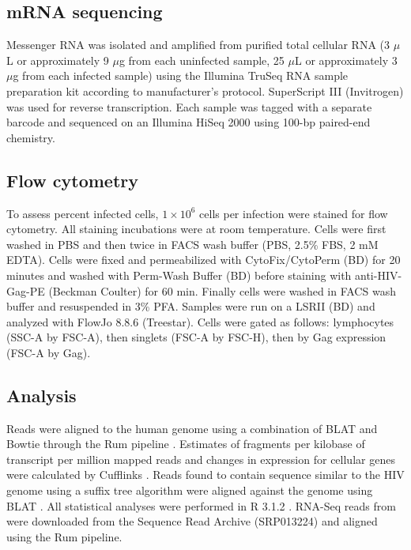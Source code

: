 \documentclass[../sherrill-Mix_thesis.tex]{subfiles}
\begin{document}
	\subsection{mRNA sequencing}
		Messenger RNA was isolated and amplified from purified total cellular RNA (3 $\mu$L or approximately 9 $\mu$g from each uninfected sample, 25 $\mu$L or approximately 3 $\mu$g from each infected sample) using the Illumina TruSeq RNA sample preparation kit according to manufacturer's protocol.  SuperScript III (Invitrogen) was used for reverse transcription. Each sample was tagged with a separate barcode and sequenced on an Illumina HiSeq 2000 using 100-bp paired-end chemistry. 

	\subsection{Flow cytometry}
		To assess percent infected cells, $1 \times 10^6$ cells per infection were stained for flow cytometry.  All staining incubations were at room temperature.  Cells were first washed in PBS and then twice in FACS wash buffer (PBS, 2.5\% FBS, 2 mM EDTA).  Cells were fixed and permeabilized with CytoFix/CytoPerm (BD) for 20 minutes and washed with Perm-Wash Buffer (BD) before staining with anti-HIV-Gag-PE (Beckman Coulter) for 60 min.  Finally cells were washed in FACS wash buffer and resuspended in 3\% PFA.  Samples were run on a LSRII (BD) and analyzed with FlowJo 8.8.6 (Treestar). Cells were gated as follows: lymphocytes (SSC-A by FSC-A), then singlets (FSC-A by FSC-H), then by Gag expression (FSC-A by Gag). 

	\subsection{Analysis}
		Reads were aligned to the human genome using a combination of BLAT \citep{Kent2002} and Bowtie \citep{Langmead2009} through the Rum pipeline \citep{Grant2011}.  Estimates of fragments per kilobase of transcript per million mapped reads and changes in expression for cellular genes were calculated by Cufflinks \citep{Trapnell2010}. Reads found to contain sequence similar to the HIV genome using a suffix tree algorithm were aligned against the \hivEight{} genome using BLAT \citep{Kent2002}. All statistical analyses were performed in R 3.1.2 \cite{RCoreTeam2012}. RNA-Seq reads from \citet{Chang2011} were downloaded from the Sequence Read Archive (SRP013224) and aligned using the Rum pipeline.
\end{document}
